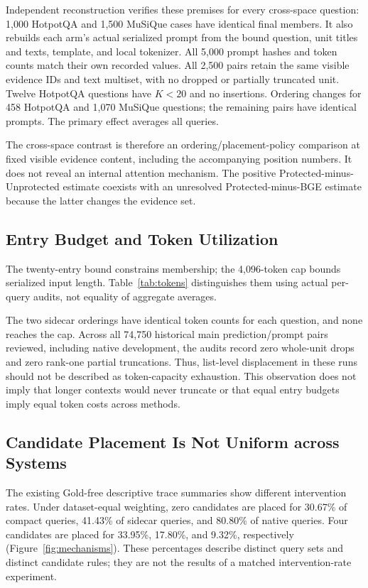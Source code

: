 \documentclass[11pt,a4paper]{article}
\begin{document}
Independent reconstruction verifies these premises for every cross-space
question: 1,000 HotpotQA and 1,500 MuSiQue cases have identical final members.
It also rebuilds each arm's actual serialized prompt from the bound question,
unit titles and texts, template, and local tokenizer. All 5,000 prompt hashes
and token counts match their own recorded values. All 2,500 pairs retain the
same visible evidence IDs and text multiset, with no dropped or partially
truncated unit. Twelve HotpotQA questions have $K<20$ and no insertions.
Ordering changes for 458 HotpotQA and 1,070 MuSiQue questions; the remaining
pairs have identical prompts. The primary effect averages all queries.

The cross-space contrast is therefore an ordering/placement-policy comparison
at fixed visible evidence content, including the accompanying position
numbers. It does not reveal an internal attention mechanism. The positive
Protected-minus-Unprotected estimate coexists with an unresolved
Protected-minus-BGE estimate because the latter changes the evidence set.

\subsection{Entry Budget and Token Utilization}
The twenty-entry bound constrains membership; the 4,096-token cap bounds
serialized input length. Table~\ref{tab:tokens} distinguishes them using
actual per-query audits, not equality of aggregate averages.

The two sidecar orderings have identical token counts for each question, and
none reaches the cap. Across all 74,750 historical main prediction/prompt
pairs reviewed, including native development, the audits record zero
whole-unit drops and zero rank-one partial truncations. Thus, list-level
displacement in these runs should not be described as token-capacity
exhaustion. This observation does not imply that longer contexts would never
truncate or that equal entry budgets imply equal token costs across methods.

\subsection{Candidate Placement Is Not Uniform across Systems}
The existing Gold-free descriptive trace summaries show different intervention
rates. Under dataset-equal weighting, zero candidates are placed for 30.67\%
of compact queries, 41.43\% of sidecar queries, and 80.80\% of native queries.
Four candidates are placed for 33.95\%, 17.80\%, and 9.32\%, respectively
(Figure~\ref{fig:mechanisms}). These percentages describe distinct query sets
and distinct candidate rules; they are not the results of a matched
intervention-rate experiment.
\end{document}
